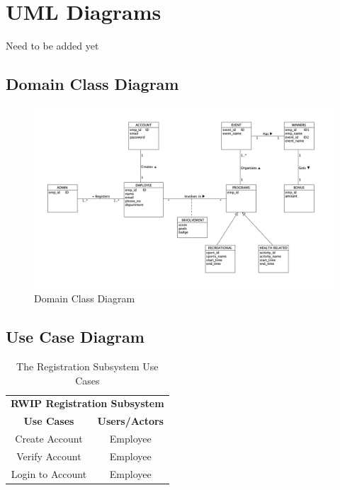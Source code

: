 \chapter{UML Diagrams}
Need to be added yet
\section{Domain Class Diagram}

\begin{figure}[h!t]
    \centering
    \includegraphics[width=\textwidth]{images/domainClass.png}
    \caption{Domain Class Diagram}
    \label{fig:domainClass}
\end{figure}

\section{Use Case Diagram}


\begin{table}[h!t]
\caption{The Registration Subsystem Use Cases}
{%
\newcommand{\mc}[2]{\multicolumn{#1}{#2}}
\begin{center}
\begin{tabular}{|c|c|}
\hline
\multicolumn{2}{|c|}{\textbf{RWIP Registration Subsystem}} \\ \cline{1-2}
\textbf{Use Cases} & \textbf{Users/Actors} \\
\hline
\rule{0pt}{24pt}  Create Account & Employee \\
\hline
\rule{0pt}{24pt}  Verify Account & Employee \\
\hline
\rule{0pt}{24pt}  Login to Account & Employee \\
\hline
\end{tabular}
\end{center}
}%
\label{tab:reg}
\end{table}

